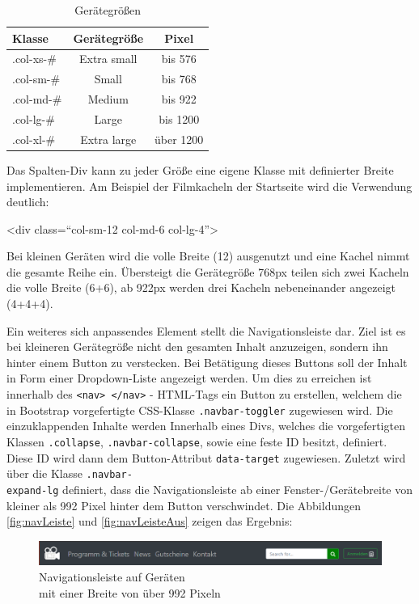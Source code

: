 	\begin{table}[H]
		\centering
		\begin{tabular}{p{} | c | c }
			\textbf{Klasse} & \textbf{Gerätegröße} & \textbf{Pixel} \\\toprule
			.col-xs-\# &  Extra small &  bis 576 \\
			.col-sm-\# &  Small &  bis 768  \\
			.col-md-\# &  Medium &  bis 922  \\
			.col-lg-\# &  Large &  bis 1200  \\
			.col-xl-\# &  Extra large &  über 1200  \\
		\end{tabular}
		\caption[Gerätegrößen]{\label{tab:gerätegrößen}Gerätegrößen }
	\end{table}
	
	Das Spalten-Div kann zu jeder Größe eine eigene Klasse mit definierter Breite implementieren. Am Beispiel der Filmkacheln der Startseite wird die Verwendung deutlich:
		\begin{center}
			<div class=“col-sm-12 col-md-6 col-lg-4”>
		\end{center}

	Bei kleinen Geräten wird die volle Breite (12) ausgenutzt und eine Kachel nimmt die gesamte Reihe ein. Übersteigt die Gerätegröße 768px teilen sich zwei Kacheln die volle Breite (6+6), ab 922px werden drei Kacheln nebeneinander angezeigt (4+4+4).
	
	Ein weiteres sich anpassendes Element stellt die Navigationsleiste dar. Ziel ist es bei kleineren Gerätegröße nicht den gesamten Inhalt anzuzeigen, sondern ihn hinter einem Button zu verstecken. Bei Betätigung dieses Buttons soll der Inhalt in Form einer Dropdown-Liste angezeigt werden. Um dies zu erreichen ist innerhalb des \texttt{<nav> </nav>} - \ac{HTML}-Tags ein Button zu erstellen, welchem die in Bootstrap vorgefertigte \acs{CSS}-Klasse \texttt{.navbar-toggler} zugewiesen wird. Die einzuklappenden Inhalte werden Innerhalb eines Divs, welches die vorgefertigten Klassen \texttt{.collapse}, \texttt{.navbar-collapse}, sowie eine feste ID besitzt, definiert. Diese ID wird dann dem Button-Attribut \texttt{data-target} zugewiesen. Zuletzt wird über die Klasse \texttt{.navbar-\\expand-lg} definiert, dass die Navigationsleiste ab einer Fenster-/Gerätebreite von kleiner als 992 Pixel hinter dem Button verschwindet. Die Abbildungen \vref{fig:navLeiste} und \vref{fig:navLeisteAus} zeigen das Ergebnis:
	\begin{figure}[H]
		\centering 
		\includegraphics[width=13cm]{img/navLeiste.png}
		\captionsetup{format=hang}
		\caption[Navigationsleiste]{\label{fig:navLeiste} Navigationsleiste auf Geräten\\ mit einer Breite von über 992 Pixeln}
	\end{figure}
	
